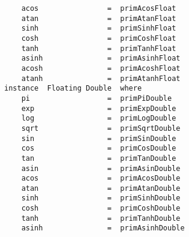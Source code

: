 \mbox{\tt \ \ \ \ acos\ \ \ \ \ \ \ \ \ \ \ \ \ \ \ \ =\ \ primAcosFloat}\\
\mbox{\tt \ \ \ \ atan\ \ \ \ \ \ \ \ \ \ \ \ \ \ \ \ =\ \ primAtanFloat}\\
\mbox{\tt \ \ \ \ sinh\ \ \ \ \ \ \ \ \ \ \ \ \ \ \ \ =\ \ primSinhFloat}\\
\mbox{\tt \ \ \ \ cosh\ \ \ \ \ \ \ \ \ \ \ \ \ \ \ \ =\ \ primCoshFloat}\\
\mbox{\tt \ \ \ \ tanh\ \ \ \ \ \ \ \ \ \ \ \ \ \ \ \ =\ \ primTanhFloat}\\
\mbox{\tt \ \ \ \ asinh\ \ \ \ \ \ \ \ \ \ \ \ \ \ \ =\ \ primAsinhFloat}\\
\mbox{\tt \ \ \ \ acosh\ \ \ \ \ \ \ \ \ \ \ \ \ \ \ =\ \ primAcoshFloat}\\
\mbox{\tt \ \ \ \ atanh\ \ \ \ \ \ \ \ \ \ \ \ \ \ \ =\ \ primAtanhFloat}
%
\eprogB\noindent\bprogB
\mbox{\tt instance\ \ Floating\ Double\ \ where}\\
\mbox{\tt \ \ \ \ pi\ \ \ \ \ \ \ \ \ \ \ \ \ \ \ \ \ \ =\ \ primPiDouble}\\
\mbox{\tt \ \ \ \ exp\ \ \ \ \ \ \ \ \ \ \ \ \ \ \ \ \ =\ \ primExpDouble}\\
\mbox{\tt \ \ \ \ log\ \ \ \ \ \ \ \ \ \ \ \ \ \ \ \ \ =\ \ primLogDouble}\\
\mbox{\tt \ \ \ \ sqrt\ \ \ \ \ \ \ \ \ \ \ \ \ \ \ \ =\ \ primSqrtDouble}\\
\mbox{\tt \ \ \ \ sin\ \ \ \ \ \ \ \ \ \ \ \ \ \ \ \ \ =\ \ primSinDouble}\\
\mbox{\tt \ \ \ \ cos\ \ \ \ \ \ \ \ \ \ \ \ \ \ \ \ \ =\ \ primCosDouble}\\
\mbox{\tt \ \ \ \ tan\ \ \ \ \ \ \ \ \ \ \ \ \ \ \ \ \ =\ \ primTanDouble}\\
\mbox{\tt \ \ \ \ asin\ \ \ \ \ \ \ \ \ \ \ \ \ \ \ \ =\ \ primAsinDouble}\\
\mbox{\tt \ \ \ \ acos\ \ \ \ \ \ \ \ \ \ \ \ \ \ \ \ =\ \ primAcosDouble}\\
\mbox{\tt \ \ \ \ atan\ \ \ \ \ \ \ \ \ \ \ \ \ \ \ \ =\ \ primAtanDouble}\\
\mbox{\tt \ \ \ \ sinh\ \ \ \ \ \ \ \ \ \ \ \ \ \ \ \ =\ \ primSinhDouble}\\
\mbox{\tt \ \ \ \ cosh\ \ \ \ \ \ \ \ \ \ \ \ \ \ \ \ =\ \ primCoshDouble}\\
\mbox{\tt \ \ \ \ tanh\ \ \ \ \ \ \ \ \ \ \ \ \ \ \ \ =\ \ primTanhDouble}\\
\mbox{\tt \ \ \ \ asinh\ \ \ \ \ \ \ \ \ \ \ \ \ \ \ =\ \ primAsinhDouble}\\

